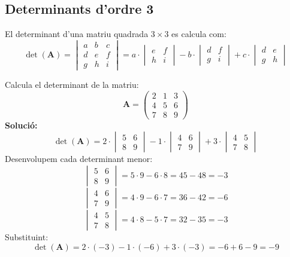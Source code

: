 \documentclass[12pt]{article}
\newcommand{\mat}[1]{\mathbf{#1}}
\begin{document}
\subsection{Determinants d'ordre 3}
\begin{concept}
El determinant d'una matriu quadrada $3 \times 3$ es calcula com:
\[
\det(\mat{A}) = 
\begin{vmatrix}
a & b & c \\
d & e & f \\
g & h & i
\end{vmatrix} 
= a \cdot \begin{vmatrix}
e & f \\
h & i
\end{vmatrix} 
- b \cdot \begin{vmatrix}
d & f \\
g & i
\end{vmatrix}
+ c \cdot \begin{vmatrix}
d & e \\
g & h
\end{vmatrix}
\]
\end{concept}

\begin{exemple}
Calcula el determinant de la matriu:
\[
\mat{A} = \begin{pmatrix}
2 & 1 & 3 \\
4 & 5 & 6 \\
7 & 8 & 9
\end{pmatrix}
\]
\textbf{Solució:}
\[
\det(\mat{A}) = 2 \cdot \begin{vmatrix}
5 & 6 \\
8 & 9
\end{vmatrix}
- 1 \cdot \begin{vmatrix}
4 & 6 \\
7 & 9
\end{vmatrix}
+ 3 \cdot \begin{vmatrix}
4 & 5 \\
7 & 8
\end{vmatrix}
\]
Desenvolupem cada determinant menor:
\[
\begin{vmatrix}
5 & 6 \\
8 & 9
\end{vmatrix} = 5\cdot9 - 6\cdot8 = 45 - 48 = -3
\]
\[
\begin{vmatrix}
4 & 6 \\
7 & 9
\end{vmatrix} = 4\cdot9 - 6\cdot7 = 36 - 42 = -6
\]
\[
\begin{vmatrix}
4 & 5 \\
7 & 8
\end{vmatrix} = 4\cdot8 - 5\cdot7 = 32 - 35 = -3
\]
Substituint:
\[
\det(\mat{A}) = 2\cdot(-3) - 1\cdot(-6) + 3\cdot(-3) = -6 + 6 - 9 = -9
\]
\end{exemple}
\end{document}
